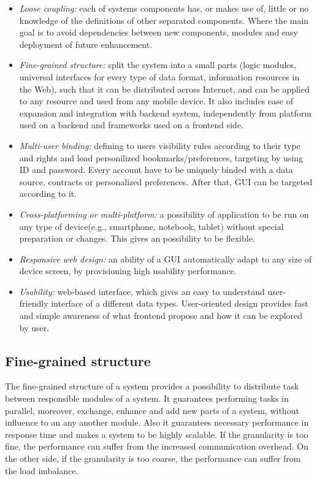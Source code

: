 \begin{itemize}
\item \emph{Loose coupling:} each of systems components has, or makes use of, little or no knowledge of the definitions of other separated components. Where the main goal is to avoid dependencies between new components, modules and easy deployment of future enhancement.
\item \emph{Fine-grained structure:} split the system into a small parts (logic modules, universal interfaces for every type of data format, information resources in the Web), such that it can be distributed across Internet, and can be applied to any resource and used from any mobile device. It also includes ease of expansion and integration with backend system, independently from platform used on a backend and frameworks used on a frontend side.
\item \emph{Multi-user binding:} defining to users visibility rules according to their type and rights and load personilized bookmarks/preferences, targeting by using ID and password. Every account have to be uniquely binded with a data source, contracts or personalized preferences. After that, GUI can be targeted according to it.
\item \emph{Cross-platforming or multi-platform:} a possibility of application to be run on any type of device(e.g., smartphone, notebook, tablet) without special preparation or changes. This gives an possibility to be flexible.
\item \emph{Responsive web design:} an ability of a GUI automatically adapt to any size of device screen, by provisioning high usability performance.
\item \emph{Usability:} web-based interface, which gives an easy to understand user-friendly interface of a different data types. User-oriented design provides fast and simple awareness of what frontend propose and how it can be explored by user.
\end{itemize} 

\subsection {Fine-grained structure}
The fine-grained structure of a system provides a possibility to distribute task between responsible modules of a system. It guarantees performing tasks in parallel, moreover, exchange, enhance and add new parts of a system, without influence to an any another module. Also it guarantees necessary performance in response time and makes a system to be highly scalable. If the granularity is too fine, the performance can suffer from the increased communication overhead. On the other side, if the granularity is too coarse, the performance can suffer from the load imbalance.

